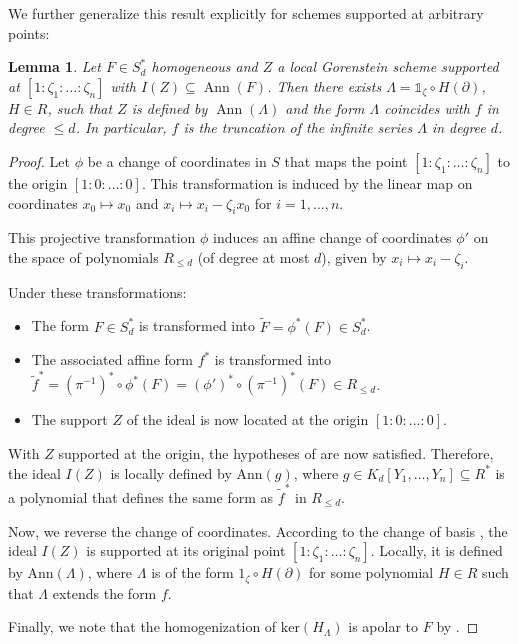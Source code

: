 \documentclass[a4paper,11p]{amsart}
\newtheorem{lemma0}[defn0]{Lemma}
\newenvironment{lemma}{\bigskip \begin{lemma0}}{\end{lemma0}}
\begin{document}
We further generalize this result explicitly for schemes supported at arbitrary points:

\begin{lemma}
Let $F\in S_d^*$ homogeneous and $Z$ a local Gorenstein scheme supported at $[1:\zeta_1:\dots:\zeta_n]$ with $I(Z)\subseteq \operatorname{Ann}(F)$. Then there exists $\Lambda=\mathds{1}_\zeta\circ H(\partial)$, $H\in R$, such that $Z$ is defined by $\operatorname{Ann}(\Lambda)$ and the form $\Lambda$ coincides with $f$ in degree $\leq d$. In particular, $f$ is the truncation of the infinite series $\Lambda$ in degree $d$. 
\end{lemma}

\begin{proof}
    Let $\phi$ be a change of coordinates in $S$ that maps the point $[1 : \zeta_1 : \dots : \zeta_n]$ to the origin $[1 : 0 : \dots : 0]$. This transformation is induced by the linear map on coordinates $x_0 \mapsto x_0$ and $x_i \mapsto x_i - \zeta_i x_0$ for $i=1, \dots, n$.

This projective transformation $\phi$ induces an affine change of coordinates $\phi'$ on the space of polynomials $R_{\le d}$ (of degree at most $d$), given by $x_i \mapsto x_i - \zeta_i$.

Under these transformations:
\begin{itemize}
    \item The form $F \in S_d^*$ is transformed into $\tilde{F} = \phi^*(F) \in S_d^*$.
    \item The associated affine form $f^*$ is transformed into $\tilde{f}^* = (\pi^{-1})^* \circ \phi^*(F) = (\phi')^* \circ (\pi^{-1})^*(F) \in R_{\le d}$.
    \item The support $Z$ of the ideal is now located at the origin $[1 : 0 : \dots : 0]$.
\end{itemize}

With $Z$ supported at the origin, the hypotheses of \cite[Proof of Proposition 4]{BJPR} are now satisfied. Therefore, the ideal $I(Z)$ is locally defined by $\text{Ann}(g)$, where $g \in K_d[Y_1, \dots, Y_n] \subseteq R^*$ is a polynomial that defines the same form as $\tilde{f}^*$ in $R_{\le d}$.

Now, we reverse the change of coordinates. According to the change of basis , the ideal $I(Z)$ is supported at its original point $[1 : \zeta_1 : \dots : \zeta_n]$. Locally, it is defined by $\text{Ann}(\Lambda)$, where $\Lambda$ is of the form $1_\zeta \circ H(\partial)$ for some polynomial $H \in R$ such that $\Lambda$ extends the form $f$.

Finally, we note that the homogenization of $\text{ker}(H_\Lambda)$ is apolar to $F$ by .
\end{proof}
\end{document}
